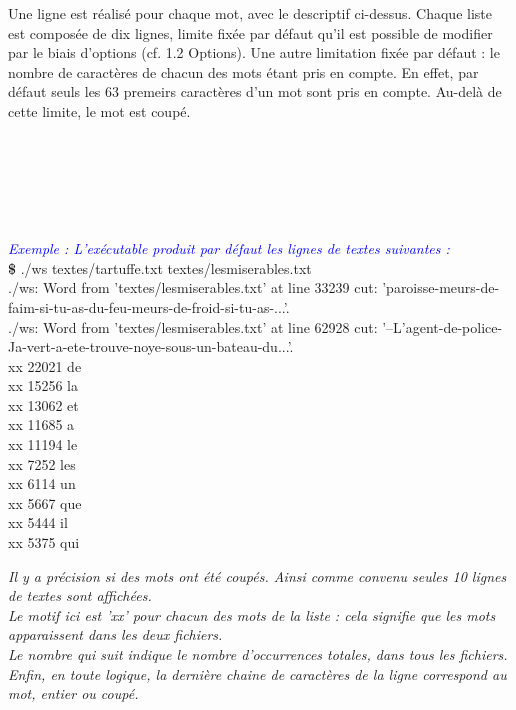 \documentclass[12pt, letterpaper]{report}
\begin{document}
Une ligne est réalisé pour chaque mot, avec le descriptif ci-dessus.
 Chaque liste est composée de dix lignes, limite fixée par défaut qu'il
  est possible de modifier par le biais d'options (cf. 1.2 Options).
Une autre limitation fixée par défaut : le nombre de caractères de chacun
des mots étant pris en compte. En effet, par défaut seuls les 63 premeirs
caractères d'un mot sont pris en compte. Au-delà de cette limite, le mot est 
coupé. 
\\ \\ \\ \\ \\ \\ \\ 
\textcolor{blue}{
\emph{Exemple : 
L'exécutable produit par défaut les lignes de textes suivantes : }}
\\\textbf{\$} ./ws textes/tartuffe.txt textes/lesmiserables.txt
\\./ws: Word from 'textes/lesmiserables.txt' at line 33239 cut: 
'paroisse-meurs-de-faim-si-tu-as-du-feu-meurs-de-froid-si-tu-as-...'.
\\./ws: Word from 'textes/lesmiserables.txt' at line 62928 cut: 
'--L'agent-de-police-Ja-vert-a-ete-trouve-noye-sous-un-bateau-du...'.
\\xx      22021   de
\\xx      15256   la
\\xx      13062   et
\\xx      11685   a
\\xx      11194   le
\\xx      7252    les
\\xx      6114    un
\\xx      5667    que
\\xx      5444    il
\\xx      5375    qui

\emph{
Il y a précision si des mots ont été coupés.
Ainsi comme convenu seules 10 lignes de textes sont affichées.
\\Le motif ici est 'xx' pour chacun des mots de la liste : cela signifie 
 que les mots apparaissent dans les deux fichiers. \\Le nombre qui suit 
 indique le nombre d'occurrences totales, dans tous les fichiers.
 \\ Enfin, en toute logique, la dernière chaine de caractères
  de la ligne correspond au mot, entier ou coupé.}
\end{document}
